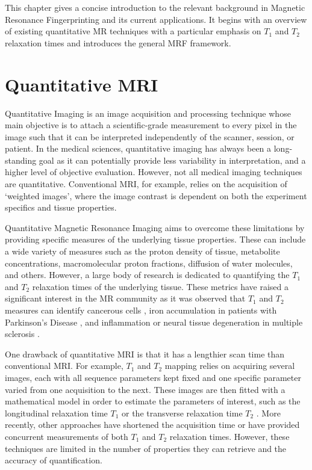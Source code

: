 
This chapter gives a concise introduction to the relevant background in Magnetic Resonance Fingerprinting and its current applications. 
It begins with an overview of existing quantitative MR techniques with a particular emphasis on $T_1$ and $T_2$ relaxation times and introduces the general MRF framework.

\hfill

\section{Quantitative MRI}\label{chapterlabel2sec21}
Quantitative Imaging is an image acquisition and processing technique whose main objective is to attach a scientific-grade measurement to every pixel in the image such that it can be interpreted independently of the scanner, session, or patient. 
In the medical sciences, quantitative imaging has always been a long-standing goal as it can potentially provide less variability in interpretation, and a higher level of objective evaluation.
However, not all medical imaging techniques are quantitative. 
Conventional MRI, for example, relies on the acquisition of `weighted images', where the image contrast is dependent on both the experiment specifics and tissue properties. 

\hfill

Quantitative Magnetic Resonance Imaging aims to overcome these limitations by providing specific measures of the underlying tissue properties. 
These can include a wide variety of measures such as the proton density of tissue, metabolite concentrations, macromolecular proton fractions, diffusion of water molecules, and others.
However, a large body of research is dedicated to quantifying the $T_1$ and $T_2$ relaxation times of the underlying tissue. 
These metrics have raised a significant interest in the MR community as it was observed that $T_1$ and $T_2$ measures can identify cancerous cells \cite{Damadian1151}, iron accumulation in patients with Parkinson's Disease \cite{JosefVymazal1999}, and inflammation or neural tissue degeneration in multiple sclerosis \cite{MillerD1998}.

\hfill

One drawback of quantitative MRI is that it has a lengthier scan time than conventional MRI. 
For example, $T_1$ and $T_2$ mapping relies on acquiring several images, each with all sequence parameters kept fixed and one specific parameter varied from one acquisition to the next. 
These images are then fitted with a mathematical model in order to estimate the parameters of interest, such as the longitudinal relaxation time $T_1$ \cite{LookLocker1970} or the transverse relaxation time $T_2$ \cite{Giri2009}. 
More recently, other approaches have shortened the acquisition time \cite{Doneva2010} or have provided concurrent measurements of both $T_1$ and $T_2$ \cite{Schmitt2004} relaxation times.
However, these techniques are limited in the number of properties they can retrieve and the accuracy of quantification.

